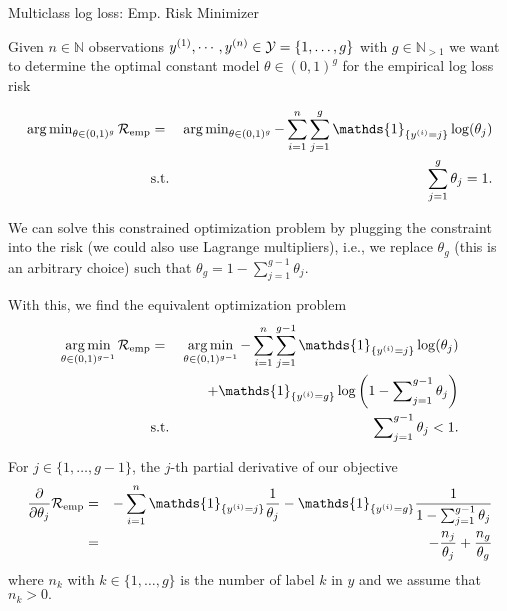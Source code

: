 \documentclass[11pt,compress,t,notes=noshow, xcolor=table]{beamer}
\begin{document}
\begin{vbframe}{Multiclass log loss: Emp. Risk Minimizer}

Given $n \in \mathbb{N}$ observations $y^{(1)}, \cdots, y^{(n)} \in \mathcal{Y} = \{1, \dots, g\}$ with $g\in\mathbb{N}_{>1}$ we want to determine the optimal constant model $\theta \in (0,1)^g$ for the empirical log loss risk

\begin{eqnarray*}
  \argmin_{\theta \in (0, 1)^g}\riske   &=& 
  \argmin_{\theta \in (0, 1)^g}-\sum^n_{i=1}\sum^g_{j=1} \mathds{1}_{\{y^{(i)} = j\}}\log(\theta_j) \\
  &\text{s.t.}& \sum^g_{j=1}\theta_j = 1.
\end{eqnarray*}

We can solve this constrained optimization problem by plugging the constraint into the risk (we could also use Lagrange multipliers), i.e., we replace $\theta_g$ (this is an arbitrary choice) such that $
 \theta_g = 1 - \sum^{g-1}_{j=1}\theta_j.
$

\framebreak 
With this, we find the equivalent optimization problem
\begin{eqnarray*}
  \mathop{\operatorname{arg\,min}}\limits_{\theta \in (0, 1)^{g-1}}\riske  & = & \mathop{\operatorname{arg\,min}}\limits_{\theta \in (0, 1)^{g-1}}
  -\sum^n_{i=1}\sum^{g-1}_{j=1} \mathds{1}_{\{y^{(i)} = j\}}\log(\theta_j) \\ 
  &&+ \mathds{1}_{\{y^{(i)} = g\}}\log\left(1 - \sum\nolimits^{g-1}_{j=1}\theta_j\right) \\
  &\text{s.t.}&  \sum\nolimits^{g-1}_{j=1}\theta_j < 1.
\end{eqnarray*}

For $j \in \{1,\dots,g-1\}$, the $j$-th partial derivative of our objective 
\begin{eqnarray*}
 \frac{\partial}{\partial \theta_j}\riske  & = & 
  -\sum^n_{i=1} \mathds{1}_{\{y^{(i)} = j\}}\frac{1}{\theta_j} - \mathds{1}_{\{y^{(i)} = g\}}\frac{1}{1 - \sum^{g-1}_{j=1}\theta_j} \\
  & = & -\frac{n_j}{\theta_j} + \frac{n_g}{\theta_g}
\end{eqnarray*}
where $n_k$ with $k\in \{1,\dots, g\}$ is the number of label $k$ in $y$ and we assume that $n_k > 0.$

\framebreak


\end{vbframe}
\end{document}
